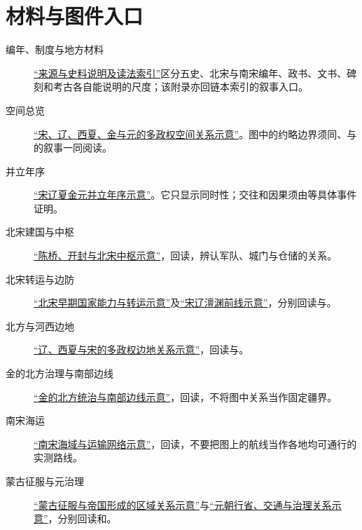 \section{材料与图件入口}
\begin{description}
  \item[编年、制度与地方材料] \hyperref[app:sources]{“来源与史料说明及读法索引”}区分五史、北宋与南宋编年、政书、文书、碑刻和考古各自能说明的尺度；该附录亦回链本索引的叙事入口。
  \item[空间总览] \hyperref[fig:vol04:overview:multi-polity-spatial]{“宋、辽、西夏、金与元的多政权空间关系示意”}。图中的约略边界须同、与的叙事一同阅读。
  \item[并立年序] \hyperref[fig:vol04:overview:multi-polity-chronology]{“宋辽夏金元并立年序示意”}。它只显示同时性；交往和因果须由等具体事件证明。
  \item[北宋建国与中枢] \hyperref[fig:vol04:northern-song:founding-chenqiao-kaifeng]{“陈桥、开封与北宋中枢示意”}，回读，辨认军队、城门与仓储的关系。
  \item[北宋转运与边防] \hyperref[fig:vol04:northern-song:early-state-capacity-transport]{“北宋早期国家能力与转运示意”}及\hyperref[fig:vol04:northern-song:song-liao-chanyuan-frontier]{“宋辽澶渊前线示意”}，分别回读与。
  \item[北方与河西边地] \hyperref[fig:vol04:liao-western-xia:multi-polity-frontiers]{“辽、西夏与宋的多政权边地关系示意”}，回读与。
  \item[金的北方治理与南部边线] \hyperref[fig:vol04:jin:northern-rule-southern-frontier]{“金的北方统治与南部边线示意”}，回读，不将图中关系当作固定疆界。
  \item[南宋海运] \hyperref[fig:vol04:southern-song:maritime-transport-network]{“南宋海域与运输网络示意”}，回读，不要把图上的航线当作各地均可通行的实测路线。
  \item[蒙古征服与元治理] \hyperref[fig:vol04:mongol-conquest:empire-formation]{“蒙古征服与帝国形成的区域关系示意”}与\hyperref[fig:vol04:yuan:governance-provincial-network]{“元朝行省、交通与治理关系示意”}，分别回读和。
\end{description}
